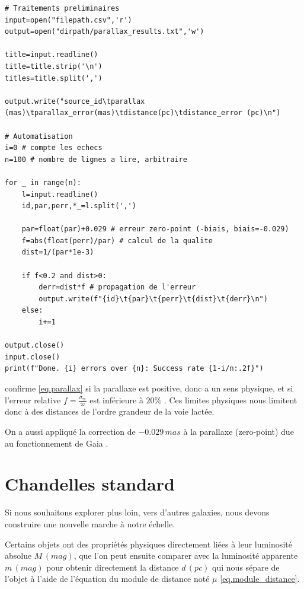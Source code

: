 \documentclass[12pt,a4paper,french]{scrartcl}
\begin{document}
\begin{lstlisting}
# Traitements preliminaires
input=open("filepath.csv",'r')
output=open("dirpath/parallax_results.txt",'w')

title=input.readline()
title=title.strip('\n')
titles=title.split(',')

output.write("source_id\tparallax (mas)\tparallax_error(mas)\tdistance(pc)\tdistance_error (pc)\n")

# Automatisation
i=0 # compte les echecs
n=100 # nombre de lignes a lire, arbitraire

for _ in range(n):
    l=input.readline()
    id,par,perr,*_=l.split(',')

    par=float(par)+0.029 # erreur zero-point (-biais, biais=-0.029)
    f=abs(float(perr)/par) # calcul de la qualite
    dist=1/(par*1e-3) 

    if f<0.2 and dist>0:
        derr=dist*f # propagation de l'erreur
        output.write(f"{id}\t{par}\t{perr}\t{dist}\t{derr}\n")
    else:
        i+=1

output.close()
input.close()
print(f"Done. {i} errors over {n}: Success rate {1-i/n:.2f}")
\end{lstlisting} %

\citet[Section~3.2]{DR2-parallax} confirme \cref{eq.parallax} si la parallaxe est positive, 
donc a un sens physique, et si l'erreur relative $f=\frac{\sigma_\varpi}{\varpi}$ est inférieure à $20\%$ \citep{parallax-stats}.
Ces limites physiques nous limitent donc à des distances de l'ordre grandeur de la voie lactée. %

On a aussi appliqué la correction de $-0.029\,mas$ à la parallaxe (zero-point) due au fonctionnement de Gaia \citep[Fig.~1]{DR2-parallax}.
\section{Chandelles standard}
Si nous souhaitons explorer plus loin, vers d'autres galaxies, nous devons construire une nouvelle marche à notre échelle.

Certains objets ont des propriétés physiques directement liées à leur luminosité absolue $M\,(mag)$, 
que l'on peut ensuite comparer avec la luminosité apparente $m\,(mag)$ pour obtenir directement la distance $d\,(pc)$ 
qui nous sépare de l'objet à l'aide de l'équation du module de distance noté $\mu$ \cref{eq.module_distance}.
\end{document}
